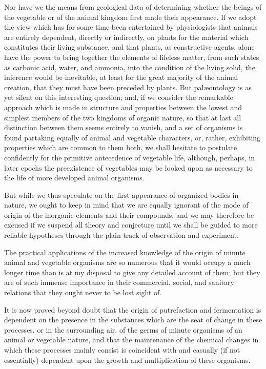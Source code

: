 \documentclass[a4paper, 11pt, oneside, english]{article}
\begin{document}
Nor have we the means from geological data of determining whether the beings of the vegetable or of the animal kingdom first made their appearance. If we adopt the view which has for some time been entertained by physiologists that animals are entirely dependent, directly or indirectly, on plants for the material which constitutes their living substance, and that plants, as constructive agents, alone have the power to bring together the elements of lifeless matter, from such states as carbonic acid, water, and ammonia, into the condition of the living solid, the inference would be inevitable, at least for the great majority of the animal creation, that they must have been preceded by plants. But palæontology is as yet silent on this interesting question; and, if we consider the remarkable approach which is made in structure and properties between the lowest and simplest members of the two kingdoms of organic nature, so that at last all distinction between them seems entirely to vanish, and a set of organisms is found partaking equally of animal and vegetable characters, or, rather, exhibiting properties which are common to them both, we shall hesitate to postulate confidently for the primitive antecedence of vegetable life, although, perhaps, in later epochs the preexistence of vegetables may be looked upon as necessary to the life of more developed animal organisms.

But while we thus speculate on the first appearance of organized bodies in nature, we ought to keep in mind that we are equally ignorant of the mode of origin of the inorganic elements and their compounds; and we may therefore be excused if we suspend all theory and conjecture until we shall be guided to more reliable hypotheses through the plain track of observation and experiment.

The practical applications of the increased knowledge of the origin of minute animal and vegetable organisms are so numerous that it would occupy a much longer time than is at my disposal to give any detailed account of them; but they are of such immense importance in their commercial, social, and sanitary relations that they ought never to be lost sight of.

It is now proved beyond doubt that the origin of putrefaction and fermentation is dependent on the presence in the substances which are the seat of change in these processes, or in the surrounding air, of the germs of minute organisms of an animal or vegetable nature, and that the maintenance of the chemical changes in which these processes mainly consist is coincident with and casually (if not essentially) dependent upon the growth and multiplication of these organisms.
\end{document}
